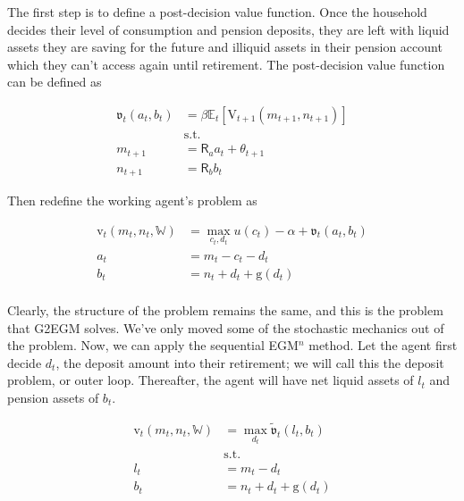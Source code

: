 \documentclass{article}
\newcommand{\DiscFac}{\beta}
\newcommand{\VFunc}{\mathrm{V}}
\newcommand{\util}{u}
\newcommand{\tShkEmp}{\theta}
\newcommand{\Ex}{\mathbb{E}}
\newcommand{\bRat}{b}
\newcommand{\cRat}{c}
\newcommand{\vFunc}{\mathrm{v}}
\newcommand{\Rfree}{\mathsf{R}}
\newcommand{\aRat}{a}
\newcommand{\mRat}{m}
\newcommand{\vOpt}{\tilde{\mathfrak{v}}}
\newcommand{\vEnd}{\mathfrak{v}}
\newcommand{\nRat}{n}
\newcommand{\dRat}{d}
\newcommand{\gFunc}{\mathrm{g}}
\newcommand{\lRat}{l}
\newcommand{\Work}{\mathbb{W}}
\newcommand{\kapShare}{\alpha}
\begin{document}
The first step is to define a post-decision value function. Once the household
decides their level of consumption and pension deposits, they are left with
liquid assets they are saving for the future and illiquid assets in their
pension account which they can't access again until retirement. The
post-decision value function can be defined as

\begin{equation}
\begin{split}
        \vEnd_{t}(\aRat_{t}, \bRat_{t}) & =  \DiscFac
        \Ex_{t} \left[ \VFunc_{t+1}(\mRat_{t+1}, \nRat_{t+1}) \right] \\
        & \text{s.t.} \\
        \mRat_{t+1} & = \Rfree_{\aRat} \aRat_{t} + \tShkEmp_{t+1} \\
        \nRat_{t+1} & = \Rfree_{\bRat} \bRat_{t}
    \end{split}
\end{equation}

Then redefine the working agent's problem as

\begin{equation}
\begin{split}
        \vFunc_{t}(\mRat_{t}, \nRat_{t}, \Work) & = \max_{\cRat_{t},
            \dRat_{t}} \util(\cRat_{t})  - \kapShare + \vEnd_{t}(\aRat_{t},
        \bRat_{t}) \\
        \aRat_{t} & = \mRat_{t} - \cRat_{t} - \dRat_{t} \\
        \bRat_{t} & = \nRat_{t} + \dRat_{t} + \gFunc(\dRat_{t}) \\
    \end{split}
\end{equation}

Clearly, the structure of the problem remains the same, and this is the problem
that G2EGM solves. We've only moved some
of the stochastic mechanics out of the problem. Now, we can apply the
sequential EGM$^n$ method. Let the agent first decide $\dRat_{t}$, the deposit
amount into their retirement; we will call this the deposit problem, or outer loop. Thereafter, the
agent will have net liquid assets
of $\lRat_{t}$ and pension assets of $\bRat_{t}$.

\begin{equation}
\begin{split}
        \vFunc_{t}(\mRat_{t}, \nRat_{t}, \Work) & = \max_{\dRat_{t}}
        \vOpt_{t}(\lRat_{t}, \bRat_{t}) \\
        & \text{s.t.} \\
        \lRat_{t} & = \mRat_{t} - \dRat_{t} \\
        \bRat_{t} & = \nRat_{t} + \dRat_{t} + \gFunc(\dRat_{t})
    \end{split}
\end{equation}
\end{document}
